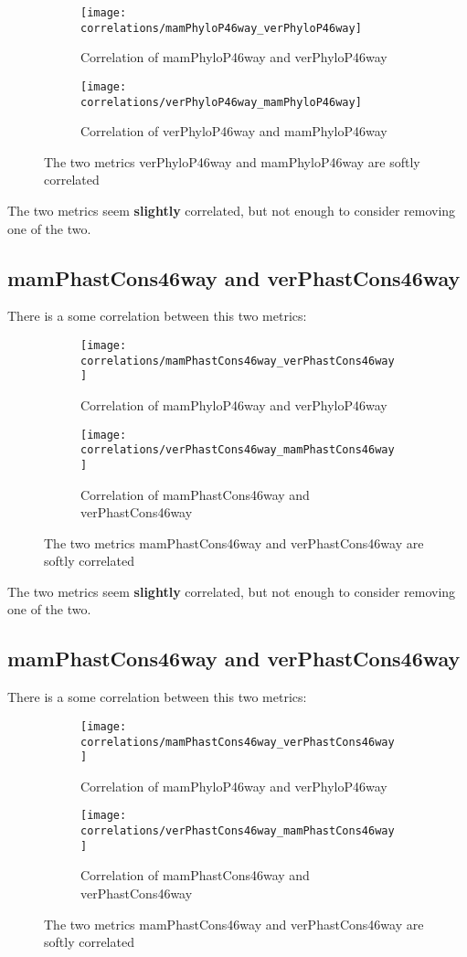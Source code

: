 \begin{figure}
	\begin{subfigure}{0.3\textwidth}
		\texttt{[image: correlations/mamPhyloP46way\_verPhyloP46way]}
		\caption{Correlation of mamPhyloP46way and verPhyloP46way}
	\end{subfigure}
	\begin{subfigure}{0.3\textwidth}
		\texttt{[image: correlations/verPhyloP46way\_mamPhyloP46way]}
		\caption{Correlation of verPhyloP46way and mamPhyloP46way}
	\end{subfigure}
	\caption{The two metrics verPhyloP46way and mamPhyloP46way are softly correlated}
\end{figure}

The two metrics seem \textbf{slightly} correlated, but not enough to consider removing one of the two.

\subsection{mamPhastCons46way and verPhastCons46way}
There is a some correlation between this two metrics:

\begin{figure}
	\begin{subfigure}{0.3\textwidth}
		\texttt{[image: correlations/mamPhastCons46way\_verPhastCons46way]}
		\caption{Correlation of mamPhyloP46way and verPhyloP46way}
	\end{subfigure}
	\begin{subfigure}{0.3\textwidth}
		\texttt{[image: correlations/verPhastCons46way\_mamPhastCons46way]}
		\caption{Correlation of mamPhastCons46way and verPhastCons46way}
	\end{subfigure}
	\caption{The two metrics mamPhastCons46way and verPhastCons46way are softly correlated}
\end{figure}

The two metrics seem \textbf{slightly} correlated, but not enough to consider removing one of the two.

\subsection{mamPhastCons46way and verPhastCons46way}
There is a some correlation between this two metrics:

\begin{figure}
	\begin{subfigure}{0.3\textwidth}
		\texttt{[image: correlations/mamPhastCons46way\_verPhastCons46way]}
		\caption{Correlation of mamPhyloP46way and verPhyloP46way}
	\end{subfigure}
	\begin{subfigure}{0.3\textwidth}
		\texttt{[image: correlations/verPhastCons46way\_mamPhastCons46way]}
		\caption{Correlation of mamPhastCons46way and verPhastCons46way}
	\end{subfigure}
	\caption{The two metrics mamPhastCons46way and verPhastCons46way are softly correlated}
\end{figure}

